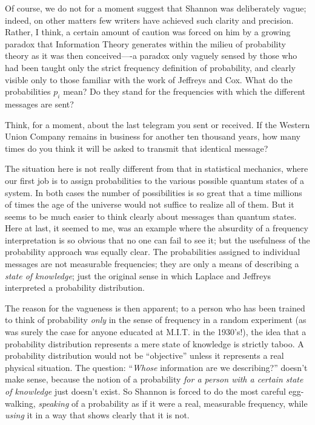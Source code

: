 Of course, we do not for a moment suggest that Shannon was deliberately vague; indeed, on other matters few writers have achieved such clarity and precision.
Rather, I think, a certain amount of caution was forced on him by a growing paradox that Information Theory generates within the milieu of probability theory as it was then conceived—-a paradox only vaguely sensed by those who had been taught only the strict frequency definition of probability, and clearly visible only to those familiar with the work of Jeffreys and Cox.
What do the probabilities $p_i$ mean?
Do they stand for the frequencies with which the different messages are sent?

Think, for a moment, about the last telegram you sent or received.
If the Western Union Company remains in business for another ten thousand years, how many times do you think it will be asked to transmit that identical message?

The situation here is not really different from that in statistical mechanics, where our first job is to assign probabilities to the various possible quantum states of a system.
In both cases the number of possibilities is so great that a time millions of times the age of the universe would not suffice to realize all of them.
But it seems to be much easier to  think clearly about messages than quantum states.
Here at last, it seemed to me, was an example where the absurdity of a frequency interpretation is so obvious that no one can fail to see it; but the usefulness of the probability approach was equally clear.
The probabilities assigned to individual messages are not measurable frequencies; they are only a means of describing a \emph{state of knowledge}; just the original sense in which Laplace and Jeffreys interpreted a probability distribution.

The reason for the vagueness is then apparent; to a person who has been trained to think of probability \emph{only} in the sense of frequency in a random experiment (as was surely the case for anyone educated at M.I.T. in the 1930's!), the idea that a probability distribution represents a mere state of knowledge is strictly taboo.
A probability distribution would not be ``objective'' unless it represents a real physical situation.
The question: ``\emph{Whose} information are we describing?'' doesn't make sense, because the notion of a probability \emph{for a person with a certain state of knowledge} just doesn't exist.
So Shannon is forced to do the most careful egg-walking, \emph{speaking} of a probability as if it were a real, measurable frequency, while \emph{using} it in a way that shows clearly that it is not.

